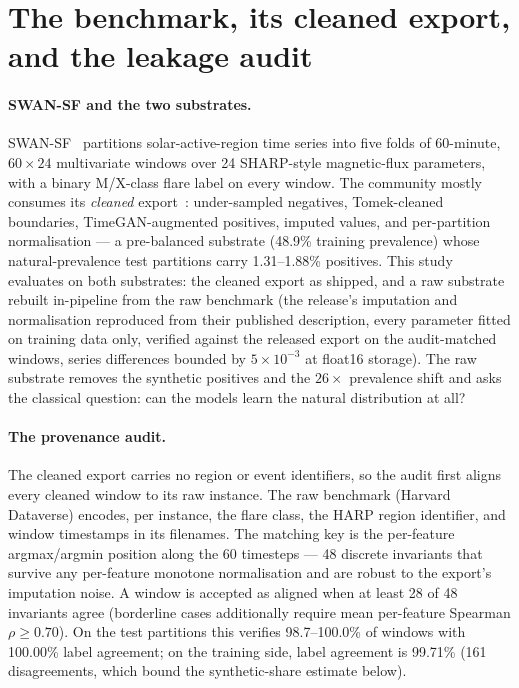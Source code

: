 \section{The benchmark, its cleaned export, and the leakage
audit}\label{sec:data}

\paragraph{SWAN-SF and the two substrates.}
SWAN-SF~\cite{angryk2020} partitions solar-active-region time series
into five folds of 60-minute, $60\times24$ multivariate windows over
24 SHARP-style magnetic-flux parameters, with a binary M/X-class
flare label on every window. The community mostly consumes its
\emph{cleaned} export~\cite{eskandari2024}: under-sampled negatives,
Tomek-cleaned boundaries, TimeGAN-augmented positives, imputed
values, and per-partition normalisation --- a pre-balanced substrate
(48.9\% training prevalence) whose natural-prevalence test
partitions carry 1.31--1.88\% positives. This study evaluates on
both substrates: the cleaned export as shipped, and a raw substrate
rebuilt in-pipeline from the raw benchmark (the release's imputation
and normalisation reproduced from their published description, every
parameter fitted on training data only, verified against the
released export on the audit-matched windows, series differences
bounded by $5\times10^{-3}$ at float16 storage). The raw substrate
removes the synthetic positives and the $26\times$ prevalence shift
and asks the classical question: can the models learn the natural
distribution at all?

\paragraph{The provenance audit.}
The cleaned export carries no region or event identifiers, so the
audit first aligns every cleaned window to its raw instance. The raw
benchmark (Harvard Dataverse) encodes, per instance, the flare
class, the HARP region identifier, and window timestamps in its
filenames. The matching key is the per-feature argmax/argmin
position along the 60 timesteps --- 48 discrete invariants that
survive any per-feature monotone normalisation and are robust to the
export's imputation noise. A window is accepted as aligned when at
least 28 of 48 invariants agree (borderline cases additionally
require mean per-feature Spearman $\rho \ge 0.70$). On the test
partitions this verifies 98.7--100.0\% of windows with 100.00\% label
agreement; on the training side, label agreement is 99.71\% (161
disagreements, which bound the synthetic-share estimate below).

